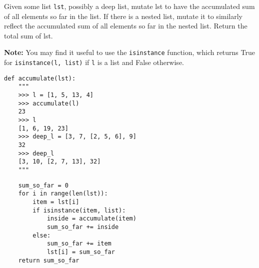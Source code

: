 \begin{blocksection}
\question Given some list \texttt{lst}, possibly a deep list, mutate lst to have
the accumulated sum of all elements so far in the list. If there is a nested
list, mutate it to similarly reflect the accumulated sum of all elements so far
in the nested list. Return the total sum of lst.

\textbf{Note:} You may find it useful to use the \texttt{isinstance} function,
which returns True for \texttt{isinstance(l, list)} if \texttt{l} is a list and
False otherwise.

\begin{lstlisting}
def accumulate(lst):
    """
    >>> l = [1, 5, 13, 4]
    >>> accumulate(l)
    23
    >>> l
    [1, 6, 19, 23]
    >>> deep_l = [3, 7, [2, 5, 6], 9]
    32
    >>> deep_l
    [3, 10, [2, 7, 13], 32]
    """
\end{lstlisting}
\begin{solution}[2.0in]
\begin{lstlisting}
    sum_so_far = 0
    for i in range(len(lst)):
        item = lst[i]
        if isinstance(item, list):
            inside = accumulate(item)
            sum_so_far += inside
        else:
            sum_so_far += item
            lst[i] = sum_so_far
    return sum_so_far
\end{lstlisting}
\end{solution}
\end{blocksection}
